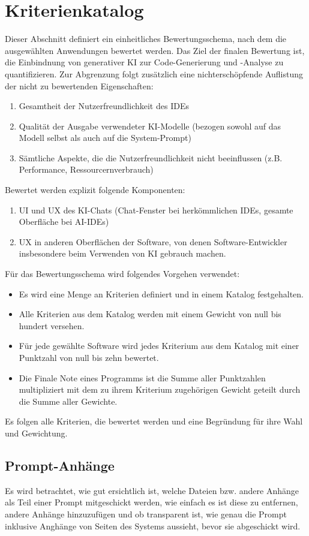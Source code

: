 \documentclass[ngerman]{seminarvorlage}
\begin{document}
\section{Kriterienkatalog}\label{sec:kriterien}
Dieser Abschnitt definiert ein einheitliches Bewertungsschema, nach dem die ausgewählten Anwendungen bewertet werden. Das Ziel der finalen Bewertung ist, die Einbindnung von generativer KI zur Code-Generierung und -Analyse zu quantifizieren. Zur Abgrenzung folgt zusätzlich eine nichterschöpfende Auflistung der nicht zu bewertenden Eigenschaften:
\begin{enumerate}
  \item Gesamtheit der Nutzerfreundlichkeit des IDEs
  \item Qualität der Ausgabe verwendeter KI-Modelle (bezogen sowohl auf das Modell selbst als auch auf die System-Prompt)
  \item Sämtliche Aspekte, die die Nutzerfreundlichkeit nicht beeinflussen (z.B. Performance, Ressourcernverbrauch)
\end{enumerate}
Bewertet werden explizit folgende Komponenten:
\begin{enumerate}
  \item UI und UX des KI-Chats (Chat-Fenster bei herkömmlichen IDEs, gesamte Oberfläche bei AI-IDEs)
  \item UX in anderen Oberflächen der Software, von denen Software-Entwickler insbesondere beim Verwenden von KI gebrauch machen.
\end{enumerate}

Für das Bewertungsschema wird folgendes Vorgehen verwendet:
\begin{itemize}
  \item Es wird eine Menge an Kriterien definiert und in einem Katalog festgehalten.
  \item Alle Kriterien aus dem Katalog werden mit einem Gewicht von null bis hundert versehen.
  \item Für jede gewählte Software wird jedes Kriterium aus dem Katalog mit einer Punktzahl von null bis zehn bewertet.
  \item Die Finale Note eines Programms ist die Summe aller Punktzahlen multipliziert mit dem zu ihrem Kriterium zugehörigen Gewicht geteilt durch die Summe aller Gewichte.

\end{itemize}
Es folgen alle Kriterien, die bewertet werden und eine Begründung für ihre Wahl und Gewichtung.

\subsection{Prompt-Anhänge}\label{krit:prompt-anhaenge}
Es wird betrachtet, wie gut ersichtlich ist, welche Dateien bzw. andere Anhänge als Teil einer Prompt mitgeschickt werden, wie einfach es ist diese zu entfernen, andere Anhänge hinzuzufügen und ob transparent ist, wie genau die Prompt inklusive Anghänge von Seiten des Systems aussieht, bevor sie abgeschickt wird.
\end{document}
